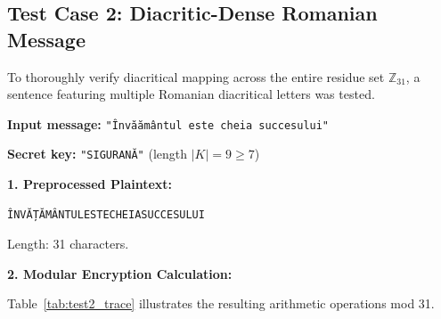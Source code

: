 \documentclass[11pt,a4paper]{article}
\begin{document}
\newpage
\subsection{Test Case 2: Diacritic-Dense Romanian Message}

To thoroughly verify diacritical mapping across the entire residue set $\mathbb{Z}_{31}$, a sentence featuring multiple Romanian diacritical letters was tested.

\noindent\textbf{Input message:} \texttt{"\^{I}nv\u{a}\u{a}m\^{a}ntul este cheia succesului"}\par
\noindent\textbf{Secret key:} \texttt{"SIGURAN\u{A}"} (length $|K| = 9 \ge 7$)\par
\smallskip

\noindent\textbf{1. Preprocessed Plaintext:}
\begin{lstlisting}[style=ciphertext]
ÎNVĂȚĂMÂNTULESTECHEIASUCCESULUI
\end{lstlisting}
Length: 31 characters.

\noindent\textbf{2. Modular Encryption Calculation:}

Table~\ref{tab:test2_trace} illustrates the resulting arithmetic operations mod 31.
\end{document}

